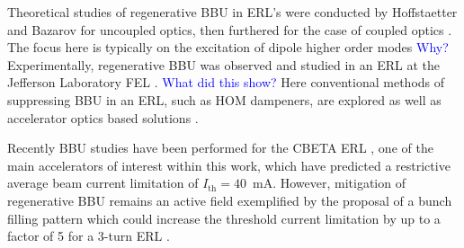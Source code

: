 \documentclass[../main.tex]{subfiles}
\begin{document}
Theoretical studies of regenerative BBU in ERL's were conducted by Hoffstaetter and Bazarov \cite{hoffstaetter2004beam} for uncoupled optics, then furthered for the case of coupled optics \cite{hoffstaetter2007recirculating}. The focus here is typically on the excitation of dipole higher order modes \textcolor{blue}{Why?} Experimentally, regenerative BBU was observed and studied in an ERL at the Jefferson Laboratory FEL \cite{tennant2005first,douglas2006experimental}. \textcolor{blue}{What did this show?} Here conventional methods of suppressing BBU \cite{tennant2004methods} in an ERL, such as HOM dampeners, are explored as well as accelerator optics based solutions \cite{rand1980beam}. 

Recently BBU studies have been performed for the CBETA ERL \cite{lou2019beam}, one of the main accelerators of interest within this work, which have predicted a restrictive average beam current limitation of $I_{\mathrm{th}} = 40$~\si{\milli\ampere}. However, mitigation of regenerative BBU remains an active field exemplified by the proposal of a bunch filling pattern which could increase the threshold current limitation by up to a factor of 5 for a 3-turn ERL \cite{setiniyaz2021filling}.    
\end{document}
